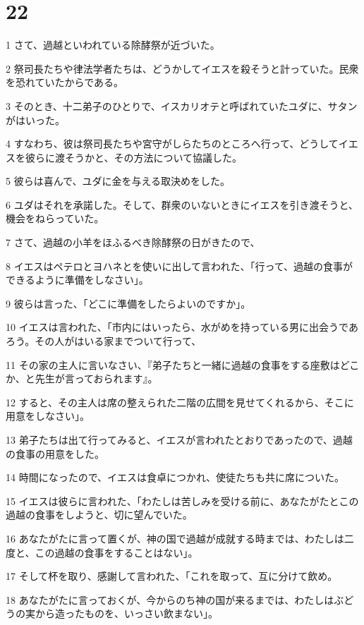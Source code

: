 \chapter{22}

\par 1 さて、過越といわれている除酵祭が近づいた。
\par 2 祭司長たちや律法学者たちは、どうかしてイエスを殺そうと計っていた。民衆を恐れていたからである。
\par 3 そのとき、十二弟子のひとりで、イスカリオテと呼ばれていたユダに、サタンがはいった。
\par 4 すなわち、彼は祭司長たちや宮守がしらたちのところへ行って、どうしてイエスを彼らに渡そうかと、その方法について協議した。
\par 5 彼らは喜んで、ユダに金を与える取決めをした。
\par 6 ユダはそれを承諾した。そして、群衆のいないときにイエスを引き渡そうと、機会をねらっていた。
\par 7 さて、過越の小羊をほふるべき除酵祭の日がきたので、
\par 8 イエスはペテロとヨハネとを使いに出して言われた、「行って、過越の食事ができるように準備をしなさい」。
\par 9 彼らは言った、「どこに準備をしたらよいのですか」。
\par 10 イエスは言われた、「市内にはいったら、水がめを持っている男に出会うであろう。その人がはいる家までついて行って、
\par 11 その家の主人に言いなさい、『弟子たちと一緒に過越の食事をする座敷はどこか、と先生が言っておられます』。
\par 12 すると、その主人は席の整えられた二階の広間を見せてくれるから、そこに用意をしなさい」。
\par 13 弟子たちは出て行ってみると、イエスが言われたとおりであったので、過越の食事の用意をした。
\par 14 時間になったので、イエスは食卓につかれ、使徒たちも共に席についた。
\par 15 イエスは彼らに言われた、「わたしは苦しみを受ける前に、あなたがたとこの過越の食事をしようと、切に望んでいた。
\par 16 あなたがたに言って置くが、神の国で過越が成就する時までは、わたしは二度と、この過越の食事をすることはない」。
\par 17 そして杯を取り、感謝して言われた、「これを取って、互に分けて飲め。
\par 18 あなたがたに言っておくが、今からのち神の国が来るまでは、わたしはぶどうの実から造ったものを、いっさい飲まない」。
